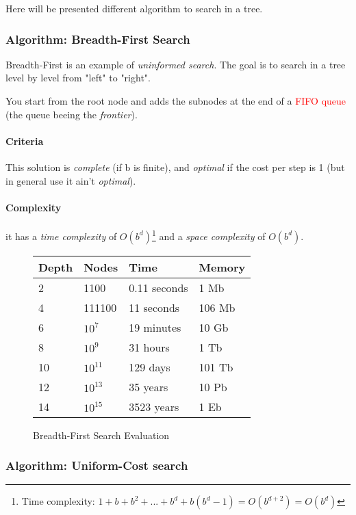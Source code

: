 Here will be presented different algorithm to search in a tree.

\subsubsection{Algorithm: Breadth-First Search}
Breadth-First is an example of \textit{uninformed search}. The goal is to search in a tree level by level from "left" to "right".

You start from the root node and adds the subnodes at the end of a 
\textcolor{red}{FIFO queue} (the queue beeing the \textit{frontier}). 

\paragraph{Criteria}
This solution is \textit{complete} (if b is finite), and \textit{optimal} if the cost per
step is 1 (but in general use it ain't \textit{optimal}).

\paragraph{Complexity}
it has a \textit{time complexity} of $O(b^d)$\footnote{Time complexity: $1+b+b^2+...+b^d+b(b^d-1) = O(b^{d+2}) = O(b^d)$} and a \textit{space complexity} of $O(b^d)$. 

\begin{figure}[H]
\centering
\begin{tabular}{|llll|}
\hline
\textbf{Depth} & \textbf{Nodes} & \textbf{Time} & \textbf{Memory} \\
\hline
2 & 1100 & 0.11 seconds & 1 Mb \\
4 & 111100 & 11 seconds & 106 Mb \\
6 & $10^7$ & 19 minutes & 10 Gb \\
8 & $10^9$ & 31 hours & 1 Tb \\
10 & $10^{11}$ & 129 days & 101 Tb \\
12 & $10^{13}$ & 35 years & 10 Pb \\
14 & $10^{15}$ & 3523 years & 1 Eb \\
\hline
\end{tabular}
\caption{Breadth-First Search Evaluation}
\end{figure}

\subsubsection{Algorithm: Uniform-Cost search}

